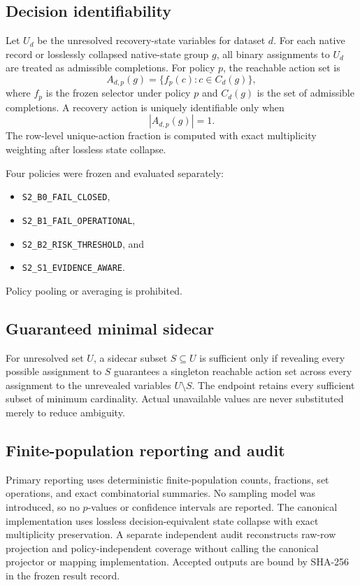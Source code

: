 \documentclass[preprint,12pt]{elsarticle}
\begin{document}
\subsection{Decision identifiability}

Let $U_d$ be the unresolved recovery-state variables for dataset $d$. For each native record or losslessly collapsed native-state group $g$, all binary assignments to $U_d$ are treated as admissible completions. For policy $p$, the reachable action set is
\[
A_{d,p}(g)=\{f_p(c):c\in C_d(g)\},
\]
where $f_p$ is the frozen selector under policy $p$ and $C_d(g)$ is the set of admissible completions. A recovery action is uniquely identifiable only when
\[
|A_{d,p}(g)|=1.
\]
The row-level unique-action fraction is computed with exact multiplicity weighting after lossless state collapse.

Four policies were frozen and evaluated separately:
\begin{itemize}[nosep,leftmargin=*]
    \item \texttt{S2\_B0\_FAIL\_CLOSED},
    \item \texttt{S2\_B1\_FAIL\_OPERATIONAL},
    \item \texttt{S2\_B2\_RISK\_THRESHOLD}, and
    \item \texttt{S2\_S1\_EVIDENCE\_AWARE}.
\end{itemize}
Policy pooling or averaging is prohibited.

\subsection{Guaranteed minimal sidecar}

For unresolved set $U$, a sidecar subset $S\subseteq U$ is sufficient only if revealing every possible assignment to $S$ guarantees a singleton reachable action set across every assignment to the unrevealed variables $U\setminus S$. The endpoint retains every sufficient subset of minimum cardinality. Actual unavailable values are never substituted merely to reduce ambiguity.

\subsection{Finite-population reporting and audit}

Primary reporting uses deterministic finite-population counts, fractions, set operations, and exact combinatorial summaries. No sampling model was introduced, so no $p$-values or confidence intervals are reported. The canonical implementation uses lossless decision-equivalent state collapse with exact multiplicity preservation. A separate independent audit reconstructs raw-row projection and policy-independent coverage without calling the canonical projector or mapping implementation. Accepted outputs are bound by SHA-256 in the frozen result record.
\end{document}
